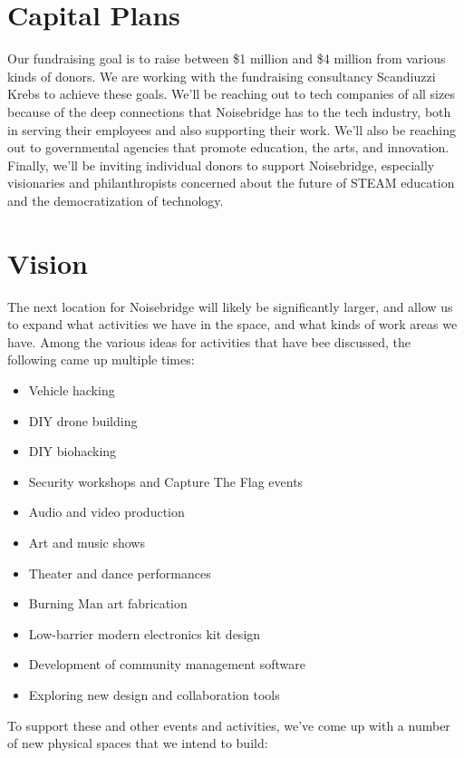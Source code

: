 \documentclass[12pt]{article}
\begin{document}
\section{Capital Plans}

Our fundraising goal is to raise between \$1 million and \$4 million from various kinds of donors. We are working with the fundraising consultancy Scandiuzzi Krebs to achieve these goals. We'll be reaching out to tech companies of all sizes because of the deep connections that Noisebridge has to the tech industry, both in serving their employees and also supporting their work. We'll also be reaching out to governmental agencies that promote education, the arts, and innovation. Finally, we'll be inviting individual donors to support Noisebridge, especially visionaries and philanthropists concerned about the future of STEAM education and the democratization of technology.





\section{Vision}

The next location for Noisebridge will likely be significantly larger, and allow us to expand what activities we have in the space, and what kinds of work areas we have. Among the various ideas for activities that have bee discussed, the following came up multiple times:

\begin{itemize}
    \item Vehicle hacking
    \item DIY drone building
    \item DIY biohacking
    \item Security workshops and Capture The Flag events
    \item Audio and video production
    \item Art and music  shows
    \item Theater and dance performances
    \item Burning Man art fabrication
    \item Low-barrier modern electronics kit design
    \item Development of community management software
    \item Exploring new design and collaboration tools
\end{itemize}

To support these and other events and activities, we've come up with a number of new physical spaces that we intend to build:
\end{document}
